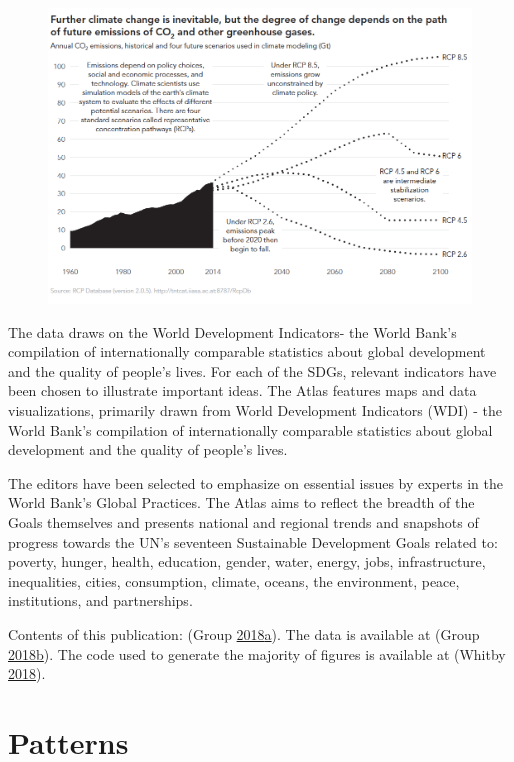\documentclass[]{book}
\begin{document}
\begin{figure}
\centering
\includegraphics{images/case_study_3.png}
\caption{}
\end{figure}

The data draws on the World Development Indicators- the World Bank's
compilation of internationally comparable statistics about global
development and the quality of people's lives. For each of the SDGs,
relevant indicators have been chosen to illustrate important ideas. The
Atlas features maps and data visualizations, primarily drawn from World
Development Indicators (WDI) - the World Bank's compilation of
internationally comparable statistics about global development and the
quality of people's lives.

The editors have been selected to emphasize on essential issues by
experts in the World Bank's Global Practices. The Atlas aims to reflect
the breadth of the Goals themselves and presents national and regional
trends and snapshots of progress towards the UN's seventeen Sustainable
Development Goals related to: poverty, hunger, health, education,
gender, water, energy, jobs, infrastructure, inequalities, cities,
consumption, climate, oceans, the environment, peace, institutions, and
partnerships.

Contents of this publication: (Group
\protect\hyperlink{ref-worldbankpub}{2018}\protect\hyperlink{ref-worldbankpub}{a}).
The data is available at (Group
\protect\hyperlink{ref-data_access}{2018}\protect\hyperlink{ref-data_access}{b}).
The code used to generate the majority of figures is available at
(Whitby \protect\hyperlink{ref-worldbankcode}{2018}).

\chapter{Patterns}\label{patterns}
\end{document}
